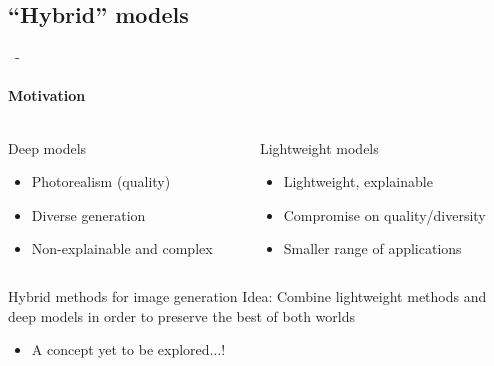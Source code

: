 \documentclass[aspectratio=169, 22pt]{beamer}
\begin{document}
\subsection{``Hybrid'' models}
\begin{frame}{\secname~- \subsecname}
  \framesubtitle{Motivation}
  \begin{columns}
    \begin{column}{0.5\linewidth}
      \begin{block}{Deep models}
        \begin{itemize}
        \item \small Photorealism (quality)
        \item \small Diverse generation
        \item \small Non-explainable and complex
        \end{itemize}
      \end{block}      
    \end{column}

    \pause
    \begin{column}{0.5\linewidth}
      \begin{customblock}{Lightweight models}
        \begin{itemize}
        \item \small Lightweight, explainable
        \item \small Compromise on quality/diversity
        \item \small Smaller range of applications
        \end{itemize}
      \end{customblock}      
    \end{column}    
  \end{columns}

  \vfill
  \pause
  \begin{exampleblock}{\centering Hybrid methods for image generation}
    \centering
    \alert{Idea}: Combine lightweight methods and deep models in order to preserve the best of both worlds
  \end{exampleblock}
  \begin{itemize}
    \centering
    \item A concept yet to be explored...!
  \end{itemize}
\end{frame}
\end{document}
